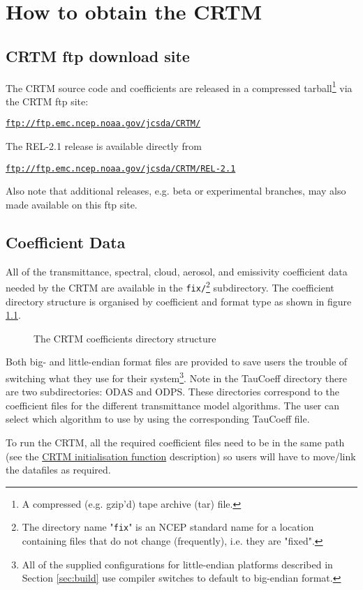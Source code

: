 \chapter{How to obtain the CRTM}

\section{CRTM ftp download site}
The CRTM source code and coefficients are released in a compressed tarball\footnote{A compressed (e.g. gzip'd) tape archive (tar) file.} via the CRTM ftp site:

\hspace{1cm}\href{ftp://ftp.emc.ncep.noaa.gov/jcsda/CRTM}{\texttt{ftp://ftp.emc.ncep.noaa.gov/jcsda/CRTM/}}

The REL-2.1 release is available directly from

\hspace{1cm}\href{ftp://ftp.emc.ncep.noaa.gov/jcsda/CRTM/REL-2.1}{\texttt{ftp://ftp.emc.ncep.noaa.gov/jcsda/CRTM/REL-2.1}}

Also note that additional releases, e.g. beta or experimental branches, may also made available on this ftp site.


\section{Coefficient Data}
All of the transmittance, spectral, cloud, aerosol, and emissivity coefficient data needed by the CRTM are available in the \texttt{fix/}\footnote{The directory name "\texttt{fix}" is an NCEP standard name for a location containing files that do not change (frequently), i.e. they are "fixed".} subdirectory. The coefficient directory structure is organised by coefficient and format type as shown in figure \ref{fig:crtm_coefficients_dir}.

\begin{figure}[htb]
  \centering
  
  \caption{The CRTM coefficients directory structure}
  \label{fig:crtm_coefficients_dir}
\end{figure}

Both big- and little-endian format files are provided to save users the trouble of switching what they use for their system\footnote{All of the supplied configurations for little-endian platforms described in Section \ref{sec:build} use compiler switches to default to big-endian format.}. Note in the TauCoeff directory there are two subdirectories: ODAS and ODPS. These directories correspond to the coefficient files for the different transmittance model algorithms. The user can select which algorithm to use by using the corresponding TauCoeff file.

To run the CRTM, all the required coefficient files need to be in the same path (see the  \hyperref[sec:CRTM_Init_interface]{CRTM initialisation function} description) so users will have to move/link the datafiles as required.
